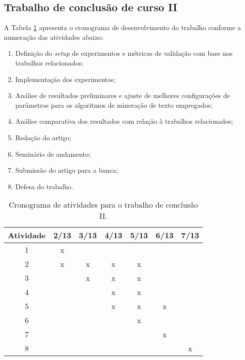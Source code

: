 \documentclass[11pt,a4paper]{article}
\begin{document}
\subsection{Trabalho de conclusão de curso II}

A Tabela \ref{tab:cronograma2} apresenta o cronograma de desenvolvimento do trabalho conforme a numeração das atividades abaixo:
\begin{enumerate}
  \item Definição do \textit{setup} de experimentos e métricas de validação com base nos trabalhos relacionados;
  \item Implementação dos experimentos;
  \item Análise de resultados preliminares e ajuste de melhores configurações de parâmetros para os algoritmos de mineração de texto empregados;
  \item Análise comparativa dos resultados com relação à trabalhos relacionados;
  \item Redação do artigo;
  \item Seminário de andamento;
  \item Submissão do artigo para a banca;
  \item Defesa do trabalho.
\end{enumerate}

\begin{table}[h]
  \begin{center}
    \caption{Cronograma de atividades para o trabalho de conclusão II. \label{tab:cronograma2}}
    \begin{tabular}{|c|c|c|c|c|c|c|}
      \hline
      \bf Atividade & \bf 2/13 & \bf 3/13 & \bf 4/13 & \bf 5/13 & \bf 6/13 & \bf 7/13  \\  \hline \hline
      1 & x &   &   &   &   &   \\ \hline
      2 & x & x & x & x &   &   \\ \hline
      3 &   & x & x & x &   &   \\ \hline
      4 &   &   & x & x &   &   \\ \hline
      5 &   &   & x & x & x &   \\ \hline
      6 &   &   &   & x  &   &   \\ \hline
      7 &   &   &   &   & x &   \\ \hline
      8 &   &   &   &   &   & x \\ \hline
    \end{tabular}
  \end{center}
\end{table}

\renewcommand\refname{Referências}
{\small
  
  
}
\end{document}
